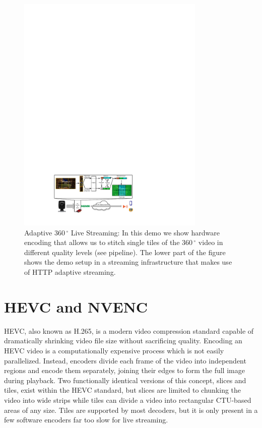 \renewcommand{\figurename}{Fig.}
\begin{figure}[t]
	\centering
	\includegraphics[width=0.8\textwidth]{figures/Streaming_scenario_v3.pdf}
	\caption{Adaptive $360\,^{\circ}$ Live Streaming: In this demo we show hardware encoding that allows us to stitch single tiles of the $360\,^{\circ}$ video in different quality levels (see pipeline). The lower part of the figure shows the demo setup in a streaming infrastructure that makes use of HTTP adaptive streaming.}
	\label{fig:pipeline}
\end{figure}

\section{HEVC and NVENC} \label{hevc}

HEVC, also known as H.265, is a modern video compression standard capable of dramatically shrinking video file size without sacrificing quality. Encoding an HEVC video is a computationally expensive process which is not easily parallelized. Instead, encoders divide each frame of the video into independent regions and encode them separately, joining their edges to form the full image during playback. Two functionally identical versions of this concept, slices and tiles, exist within the HEVC standard, but slices are limited to chunking the video into wide strips while tiles can divide a video into rectangular CTU-based areas of any size. Tiles are supported by most decoders, but it is only present in a few software encoders far too slow for live streaming.

